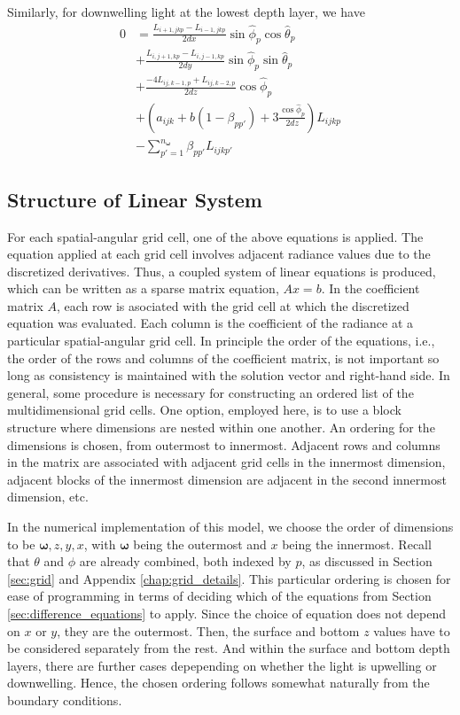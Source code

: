 \documentclass[ms,cpyr,lof,lot]{uathesis}
\renewcommand\vec\bm
\begin{document}
Similarly, for downwelling light at the lowest depth layer, we have
\begin{equation*}
  \begin{aligned}
    0 &= \frac{L_{i+1,jkp}-L_{i-1,jkp}}{2dx}\sin\hat{\phi}_p\cos\hat{\theta}_p \\
    &+ \frac{L_{i,j+1,kp}-L_{i,j-1,kp}}{2dy}\sin\hat{\phi}_p\sin\hat{\theta}_p \\
    &+ \frac{-4L_{ij,k-1,p} + L_{ij,k-2,p}}{2dz}\cos\hat{\phi}_p \\
    &+ \left(a_{ijk}+b(1-\beta_{pp'}) + 3\frac{\cos\hat\phi_p}{2dz} \right)L_{ijkp} \\
    &- \sum_{p'=1}^{n_{\vec{\omega}}} \beta_{pp'} L_{ijkp'}
  \end{aligned}
\end{equation*}

\subsection{Structure of Linear System}
For each spatial-angular grid cell, one of the above equations is applied.
The equation applied at each grid cell involves adjacent radiance values due to the discretized derivatives.
Thus, a coupled system of linear equations is produced, which can be written as a sparse matrix equation, $Ax=b$.
In the coefficient matrix $A$, each row is asociated with the grid cell at which the discretized equation was evaluated.
Each column is the coefficient of the radiance at a particular spatial-angular grid cell.
In principle the order of the equations, i.e., the order of the rows and columns of the coefficient matrix, is not important
so long as consistency is maintained with the solution vector and right-hand side.
In general, some procedure is necessary for constructing an ordered list of the multidimensional grid cells.
One option, employed here, is to use a block structure where dimensions are nested within one another.
An ordering for the dimensions is chosen, from outermost to innermost.
Adjacent rows and columns in the matrix are associated with adjacent grid cells in the innermost dimension,
adjacent blocks of the innermost dimension are adjacent in the second innermost dimension, etc.

In the numerical implementation of this model, we choose the order of dimensions to be $\vec{\omega}, z, y, x$, with $\vec{\omega}$ being the outermost and $x$ being the innermost.
Recall that $\theta$ and $\phi$ are already combined, both indexed by $p$, as discussed in Section \ref{sec:grid} and Appendix \ref{chap:grid_details}.
This particular ordering is chosen for ease of programming in terms of deciding which of the equations from Section \ref{sec:difference_equations} to apply.
Since the choice of equation does not depend on $x$ or $y$, they are the outermost.
Then, the surface and bottom $z$ values have to be considered separately from the rest.
And within the surface and bottom depth layers, there are further cases depepending on whether the light is upwelling or downwelling.
Hence, the chosen ordering follows somewhat naturally from the boundary conditions.
\end{document}
